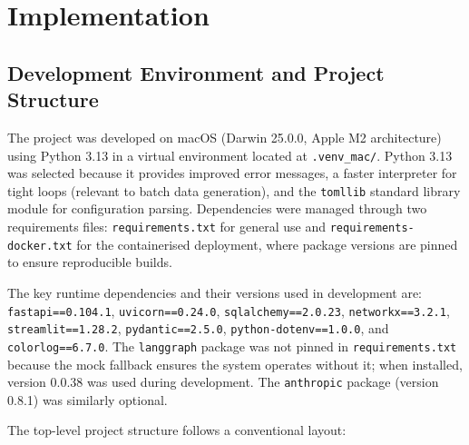 \documentclass[12pt,a4paper]{report}
\begin{document}
\chapter{Implementation}
\label{ch:implementation}

\section{Development Environment and Project Structure}
\label{sec:dev-env}

The project was developed on macOS (Darwin 25.0.0, Apple M2 architecture) using Python 3.13 in a virtual environment located at \texttt{.venv\_mac/}. Python 3.13 was selected because it provides improved error messages, a faster interpreter for tight loops (relevant to batch data generation), and the \texttt{tomllib} standard library module for configuration parsing. Dependencies were managed through two requirements files: \texttt{requirements.txt} for general use and \texttt{requirements-docker.txt} for the containerised deployment, where package versions are pinned to ensure reproducible builds.

The key runtime dependencies and their versions used in development are: \texttt{fastapi==0.104.1}, \texttt{uvicorn==0.24.0}, \texttt{sqlalchemy==2.0.23}, \texttt{networkx==3.2.1}, \texttt{streamlit==1.28.2}, \texttt{pydantic==2.5.0}, \texttt{python-dotenv==1.0.0}, and \texttt{colorlog==6.7.0}. The \texttt{langgraph} package was not pinned in \texttt{requirements.txt} because the mock fallback ensures the system operates without it; when installed, version 0.0.38 was used during development. The \texttt{anthropic} package (version 0.8.1) was similarly optional.

The top-level project structure follows a conventional layout:
\end{document}
